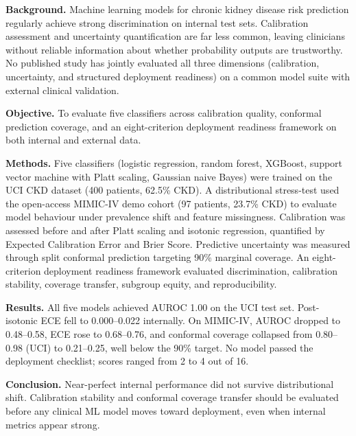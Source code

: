 \noindent\textbf{Background.}
Machine learning models for chronic kidney disease risk prediction regularly achieve strong discrimination on internal test sets. Calibration assessment and uncertainty quantification are far less common, leaving clinicians without reliable information about whether probability outputs are trustworthy. No published study has jointly evaluated all three dimensions (calibration, uncertainty, and structured deployment readiness) on a common model suite with external clinical validation.

\medskip
\noindent\textbf{Objective.}
To evaluate five classifiers across calibration quality, conformal prediction coverage, and an eight-criterion deployment readiness framework on both internal and external data.

\medskip
\noindent\textbf{Methods.}
Five classifiers (logistic regression, random forest, XGBoost, support vector machine with Platt scaling, Gaussian naive Bayes) were trained on the UCI CKD dataset (400 patients, 62.5\% CKD). A distributional stress-test used the open-access MIMIC-IV demo cohort (97 patients, 23.7\% CKD) to evaluate model behaviour under prevalence shift and feature missingness. Calibration was assessed before and after Platt scaling and isotonic regression, quantified by Expected Calibration Error and Brier Score. Predictive uncertainty was measured through split conformal prediction targeting 90\% marginal coverage. An eight-criterion deployment readiness framework evaluated discrimination, calibration stability, coverage transfer, subgroup equity, and reproducibility.

\medskip
\noindent\textbf{Results.}
All five models achieved AUROC 1.00 on the UCI test set. Post-isotonic ECE fell to 0.000--0.022 internally. On MIMIC-IV, AUROC dropped to 0.48--0.58, ECE rose to 0.68--0.76, and conformal coverage collapsed from 0.80--0.98 (UCI) to 0.21--0.25, well below the 90\% target. No model passed the deployment checklist; scores ranged from 2 to 4 out of 16.

\medskip
\noindent\textbf{Conclusion.}
Near-perfect internal performance did not survive distributional shift. Calibration stability and conformal coverage transfer should be evaluated before any clinical ML model moves toward deployment, even when internal metrics appear strong.
